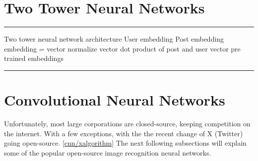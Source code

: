 \section{Two Tower Neural Networks}

\noindent\rule{2cm}{0.4pt}

Two tower neural network architecture 
User embedding
Post embedding
embedding = vector
normalize vector
dot product of post and user vector
pre trained embeddings

\noindent\rule{2cm}{0.4pt}

\section{Convolutional Neural Networks} \label{cnn}

Unfortunately, most large corporations are closed-source, keeping competition on the internet. With a few exceptions, with the the recent change of X (Twitter) going open-source. \ref{cnn/xalgorithm} The next following subsections will explain some of the popular open-source image recognition neural networks.








